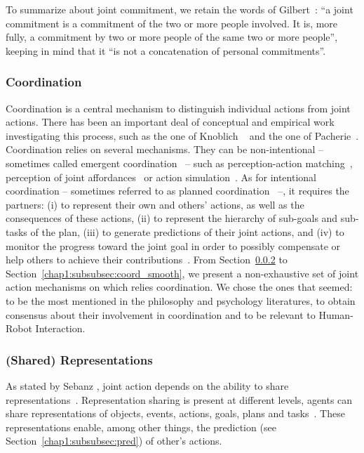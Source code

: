 \documentclass[a4paper,11pt,twoside]{StyleThese}
\begin{document}
To summarize about joint commitment, we retain the words of Gilbert~\cite[p.~7]{gilbert_2013_joint}: ``a joint commitment is a commitment of the two or more people involved. It is, more fully, a commitment by two or more people of the same two or more people'', keeping in mind that it ``is not a concatenation of personal commitments''. 

\subsubsection{Coordination}
Coordination is a central mechanism to distinguish individual actions from joint actions. There has been an important deal of conceptual and empirical work investigating this process, such as the one of Knoblich \etal~\cite{knoblich_2011_joint} and the one of Pacherie~\cite{pacherie_2012_agency}. Coordination relies on several mechanisms. They can be non-intentional -- sometimes called emergent coordination~\cite{knoblich_2011_joint} -- such as perception-action matching~\cite{brass_2001_movement}, perception of joint affordances~\cite{ramenzoni_2008_short} or action simulation~\cite{sebanz_2009_prediction}. As for intentional coordination – sometimes referred to as planned coordination~\cite{knoblich_2011_joint} –, it requires the partners: (i) to represent their own and others' actions, as well as the consequences of these actions, (ii) to represent the hierarchy of sub-goals and sub-tasks of the plan, (iii) to generate predictions of their joint actions, and (iv) to monitor the progress toward the joint goal in order to possibly compensate or help others to achieve their contributions~\cite{pacherie_2012_agency}. From Section~\ref{chap1:subsubsec:shared_rep} to Section~\ref{chap1:subsubsec:coord_smooth}, we present a non-exhaustive set of joint action mechanisms on which relies coordination. We chose the ones that seemed: to be the most mentioned in the philosophy and psychology literatures, to obtain consensus about their involvement in coordination and to be relevant to Human-Robot Interaction. 

\subsubsection{(Shared) Representations}\label{chap1:subsubsec:shared_rep}
As stated by Sebanz \etal, joint action depends on the ability to share representations~\cite{sebanz_2006_joint}. Representation sharing is present at different levels, \ie agents can share representations of objects, events, actions, goals, plans and tasks~\cite{pacherie_2012_agency,vesper_2017_joint}. These representations enable, among other things, the prediction (see Section~\ref{chap1:subsubsec:pred}) of other's actions. 
\end{document}
